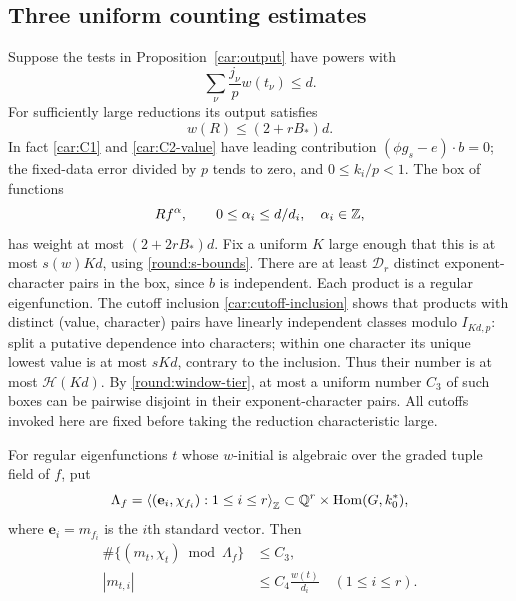 \subsection{Three uniform counting estimates}

Suppose the tests in Proposition~\ref{car:output} have powers with
\begin{equation}\label{round:test-cost}
 \sum_\nu\frac{j_\nu}{p}w(t_\nu)\le d.
\end{equation}
For sufficiently large reductions its output satisfies
\begin{equation}\label{round:R-cost}
 w(R)\le(2+rB_*)d.
\end{equation}
In fact \eqref{car:C1} and \eqref{car:C2-value} have leading
contribution $(\phi g_s-e)\cdot b=0$; the fixed-data error divided
by $p$ tends to zero, and $0\le k_i/p<1$. The box of functions
\begin{equation}\label{round:basic-box}
 Rf^\alpha,\qquad
 0\le\alpha_i\le d/d_i,\quad\alpha_i\in\mathbb Z,
\end{equation}
has weight at most $(2+2rB_*)d$. Fix a uniform $K$ large enough
that this is at most $s(w)Kd$, using \eqref{round:s-bounds}.
There are at least $\mathcal D_r$ distinct exponent-character
pairs in the box, since $b$ is independent. Each product is a
regular eigenfunction. The cutoff inclusion
\eqref{car:cutoff-inclusion} shows that products with distinct
(value, character) pairs have linearly independent classes modulo
$I_{Kd,p}$: split a putative dependence into characters; within one
character its unique lowest value is at most $sKd$, contrary to
the inclusion. Thus their number
is at most $\mathcal H(Kd)$. By \eqref{round:window-tier}, at most
a uniform number $C_3$ of such boxes can be pairwise disjoint in
their exponent-character pairs. All cutoffs invoked here are fixed
before taking the reduction characteristic large.

\begin{lemma}\label{round:algebraic-counts}
For regular eigenfunctions $t$ whose $w$-initial is algebraic over
the graded tuple field of $f$, put
\[
 \Lambda_f=\left\langle(\mathbf e_i,\chi_{f_i}):1\le i\le r
                     \right\rangle_{\mathbb Z}
 \subset\mathbb Q^r\times\operatorname{Hom}(G,k_0^*),
\]
where $\mathbf e_i=m_{f_i}$ is the $i$th standard vector. Then
\begin{align}
 \#\{(m_t,\chi_t)\bmod\Lambda_f\}&\le C_3,
 \label{round:U1}\\
 |m_{t,i}|&\le C_4\frac{w(t)}{d_i}\quad(1\le i\le r).
 \label{round:U2}
\end{align}
\end{lemma}

